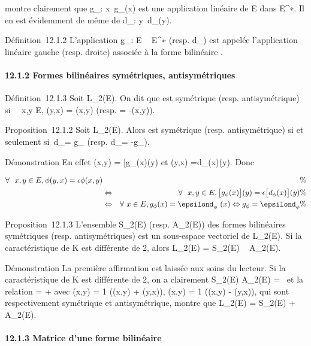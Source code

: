 \documentclass[]{article}
\begin{document}
montre clairement que g_\phi :
x\mapsto~g_\phi(x) est une application
linéaire de E dans E^∗. Il en est évidemment de même de
d_\phi : y\mapsto~d_\phi(y).

Définition~12.1.2 L'application g_\phi : E \rightarrow~ E^∗ (resp.
d_\phi) est appelée l'application linéaire gauche (resp. droite)
associée à la forme bilinéaire \phi.

\paragraph{12.1.2 Formes bilinéaires symétriques, antisymétriques}

Définition~12.1.3 Soit \phi \in L_2(E). On dit que \phi est symétrique
(resp. antisymétrique) si \forall~~x,y \in E, \phi(y,x) =
\phi(x,y) (resp. = -\phi(x,y)).

Proposition~12.1.2 Soit \phi \in L_2(E). Alors \phi est symétrique
(resp. antisymétrique) si et seulement si~d_\phi = g_\phi
(resp. d_\phi = -g_\phi).

Démonstration En effet \phi(x,y) =\big
{[}g_\phi(x)\big {]}(y) et \phi(y,x)
=\big {[}d_\phi(x)\big {]}(y). Donc

\begin{align*} \forall~~x,y \in E,
\phi(y,x) = \epsilon\phi(x,y)&& \%& \\ &
\Leftrightarrow & \forall~~x,y \in E,
\big {[}g_\phi(x)\big {]}(y) =
\epsilon\big {[}d_\phi(x)\big {]}(y) \%&
\\ & \Leftrightarrow &
\forall~x \in E, g_\phi(x) = \epsilond_\phi~(x)
\Leftrightarrow g_\phi = \epsilond_\phi\%&
\\ \end{align*}

Proposition~12.1.3 L'ensemble S_2(E) (resp. A_2(E))
des formes bilinéaires symétriques (resp. antisymétriques) est un
sous-espace vectoriel de L_2(E). Si la caractéristique de K est
différente de 2, alors L_2(E) = S_2(E) \oplus~
A_2(E).

Démonstration La première affirmation est laissée aux soins du lecteur.
Si la caractéristique de K est différente de 2, on a clairement
S_2(E) \bigcap A_2(E) =
\0\ et la relation \phi = \psi + \theta avec
\psi(x,y) = 1  (\phi(x,y) + \phi(y,x)), \theta(x,y) = 1
 (\phi(x,y) - \phi(y,x)), qui sont respectivement
symétrique et antisymétrique, montre que L_2(E) =
S_2(E) + A_2(E).

\paragraph{12.1.3 Matrice d'une forme bilinéaire}
\end{document}
